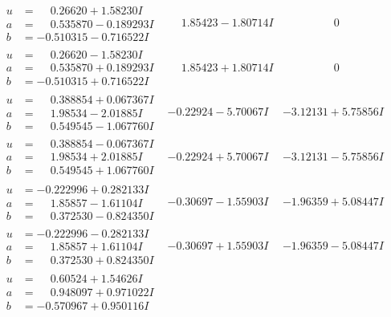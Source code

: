 \documentclass[1p]{elsarticle_modified}
\theoremstyle{definition}
\begin{document}
$$\begin{array}{c|c|c}
\begin{aligned}
u &= \phantom{-}0.26620 + 1.58230 I \\
a &= \phantom{-}0.535870 - 0.189293 I \\
b &= -0.510315 - 0.716522 I\end{aligned}
 & \phantom{-}1.85423 - 1.80714 I & \phantom{-0.000000 } 0 \\ \hline\begin{aligned}
u &= \phantom{-}0.26620 - 1.58230 I \\
a &= \phantom{-}0.535870 + 0.189293 I \\
b &= -0.510315 + 0.716522 I\end{aligned}
 & \phantom{-}1.85423 + 1.80714 I & \phantom{-0.000000 } 0 \\ \hline\begin{aligned}
u &= \phantom{-}0.388854 + 0.067367 I \\
a &= \phantom{-}1.98534 - 2.01885 I \\
b &= \phantom{-}0.549545 - 1.067760 I\end{aligned}
 & -0.22924 - 5.70067 I & -3.12131 + 5.75856 I \\ \hline\begin{aligned}
u &= \phantom{-}0.388854 - 0.067367 I \\
a &= \phantom{-}1.98534 + 2.01885 I \\
b &= \phantom{-}0.549545 + 1.067760 I\end{aligned}
 & -0.22924 + 5.70067 I & -3.12131 - 5.75856 I \\ \hline\begin{aligned}
u &= -0.222996 + 0.282133 I \\
a &= \phantom{-}1.85857 - 1.61104 I \\
b &= \phantom{-}0.372530 - 0.824350 I\end{aligned}
 & -0.30697 - 1.55903 I & -1.96359 + 5.08447 I \\ \hline\begin{aligned}
u &= -0.222996 - 0.282133 I \\
a &= \phantom{-}1.85857 + 1.61104 I \\
b &= \phantom{-}0.372530 + 0.824350 I\end{aligned}
 & -0.30697 + 1.55903 I & -1.96359 - 5.08447 I \\ \hline\begin{aligned}
u &= \phantom{-}0.60524 + 1.54626 I \\
a &= \phantom{-}0.948097 + 0.971022 I \\
b &= -0.570967 + 0.950116 I\end{aligned}

\end{array}$$
\end{document}

